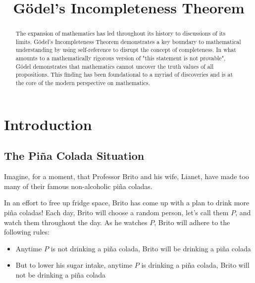 \documentclass[conference]{IEEEtran}
\begin{document}
\title{Gödel's Incompleteness Theorem\\}

\author{
\and
{}
\and
{}
}

\maketitle

\begin{abstract}
The expansion of mathematics has led throughout its history to discussions of its limits. Gödel's Incompleteness Theorem demonstrates a key boundary to mathematical understanding by using self-reference to disrupt the concept of completeness. In what amounts to a mathematically rigorous version of "this statement is not provable", Gödel demonstrates that mathematics cannot uncover the truth values of all propositions. This finding has been foundational to a myriad of discoveries and is at the core of the modern perspective on mathematics.
\end{abstract}

\section{Introduction}
\subsection{The Piña Colada Situation}
Imagine, for a moment, that Professor Brito and his wife, Lianet, have made too many of their famous non-alcoholic piña coladas.

In an effort to free up fridge space, Brito has come up with a plan to drink more piña coladas! Each day, Brito will choose a random person, let's call them $P$, and watch them throughout the day. As he watches $P$, Brito will adhere to the following rules:
\begin{itemize}
    \item Anytime $P$ is not drinking a piña colada, Brito will be drinking a piña colada
    \item But to lower his sugar intake, anytime $P$ is drinking a piña colada, Brito will not be drinking a piña colada
\end{itemize}
\end{document}
